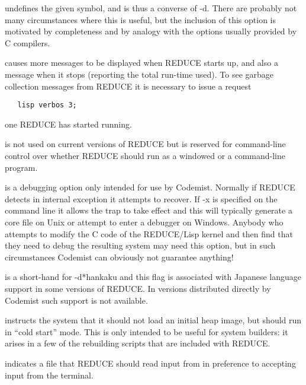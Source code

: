 \documentclass[a4paper,11pt]{article}
\begin{document}
\begin{description}
\item[{\ttfamily -u \rmfamily \slshape name}] undefines the given symbol,
and is thus a converse of {\ttfamily -d}. There are probably not many
circumstances where this is useful, but the inclusion of this option is
motivated by completeness and by analogy with the options usually provided
by C compilers.

\item[{\ttfamily -v}] causes more messages to be displayed when REDUCE starts
up, and also a message when it stops (reporting the total run-time used).
To see garbage collection messages from REDUCE it is necessary to issue
a request
\begin{verbatim}
   lisp verbos 3;
\end{verbatim}
\item one REDUCE has started running.

\item[{\ttfamily -w}] is not used on current versions of REDUCE but is
reserved for command-line control over whether REDUCE should run as a
windowed or a command-line program.

\item[{\ttfamily -x}] is a debugging option only intended for use by Codemist.
Normally if REDUCE detects in internal exception it attempts to recover.
If {\ttfamily -x} is specified on the command line it allows the trap to
take effect and this will typically generate a {\ttfamily core} file
on Unix or attempt to enter a debugger on Windows.  Anybody who attempts
to modify the C code of the REDUCE/Lisp kernel and then find that they
need to debug the resulting system may need this option, but in such
circumstances Codemist can obviously not guarantee anything!

\item[{\ttfamily -y}] is a short-hand for {\ttfamily -d*hankaku} and this
flag is associated with Japanese language support in some versions of
REDUCE. In versions distributed directly by Codemist such support
is not available.

\item[{\ttfamily -z}] instructs the system that it should not load an 
initial heap image, but should
run in ``cold start'' mode.  This is only intended to be useful for
system builders: it arises in a few of the rebuilding scripts that are
included with REDUCE.

\item[{\slshape filename}] indicates a file that REDUCE should read input
from in preference to accepting input from the terminal.
\end{description}
\end{document}
